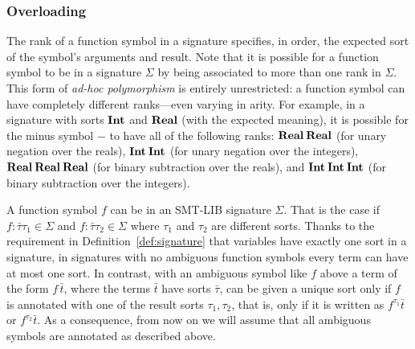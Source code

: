 \subsubsection{Overloading}
The rank of a function symbol in a signature specifies, in order,
the expected sort of the symbol's arguments and result.
Note that it is possible for a function symbol
to be  in a signature $\Sigma$
by being associated to more than one rank in $\Sigma$.
This form of \emph{ad-hoc polymorphism} is entirely unrestricted: 
a function symbol can have completely different ranks---even varying in arity. 
For example,
in a signature with sorts $\textbf{Int}$ and $\textbf{Real}$ (with the expected meaning),
it is possible for the minus symbol $-$ to have all of the following ranks:  
$\textbf{Real}\:\textbf{Real}$ (for unary negation over the reals),
$\textbf{Int}\:\textbf{Int}$ (for unary negation over the integers),
$\textbf{Real}\:\textbf{Real}\:\textbf{Real}$ (for binary subtraction over the reals),
and
$\textbf{Int}\:\textbf{Int}\:\textbf{Int}$ (for binary subtraction over the integers).


A function symbol $f$ can be 
in an SMT-LIB signature $\Sigma$.
That is the case if $f:\bar{\tau}\tau_1 \in \Sigma$ and $f:\bar{\tau}\tau_2 \in \Sigma$ 
where $\tau_1$ and $\tau_2$ are different sorts.
Thanks to the requirement in Definition~\ref{def:signature} that
variables have exactly one sort in a signature,
in signatures with no ambiguous function symbols
every term can have at most one sort.
In contrast,
with an ambiguous symbol like $f$ above
a term of the form $f\, \bar{t}$,
where the terms $\bar t$ have sorts $\bar \tau$, can be given 
a unique sort only if $f$ is annotated with one of the result sorts $\tau_1, \tau_2$,
that is, only if it is written as $f^{\tau_1}\bar{t}$ or $f^{\tau_2}\bar{t}$. 
As a consequence, from now on we will assume 
that all ambiguous symbols are annotated as  described above.

